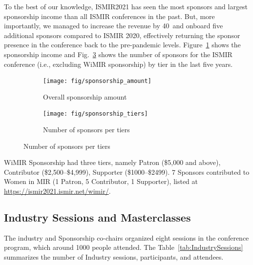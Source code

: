 \documentclass[%
10pt,								%
titlepage,						%
]
{scrartcl}
\begin{document}
        To the best of our knowledge, ISMIR2021 has seen the most sponsors and largest sponsorship income than all ISMIR conferences in the past. But, more importantly, we managed to increase the revenue by 40\ and onboard five additional sponsors compared to ISMIR 2020, effectively returning the sponsor presence in the conference back to the pre-pandemic levels. Figure~\ref{fig:sponsorship_amount} shows the sponsorship income and Fig.~\ref{fig:sponsorship_tiers} shows the number of sponsors for the ISMIR conference (i.e., excluding WiMIR sponsorship) by tier in the last five years.  
        \begin{figure}%
            \centering
            \begin{subfigure}{.45\textwidth}
                \texttt{[image: fig/sponsorship\_amount]}%
                \caption{Overall sponsorship amount}%
                \label{fig:sponsorship_amount}%
            \end{subfigure}
            \hfill
            \begin{subfigure}{.45\textwidth}
                \texttt{[image: fig/sponsorship\_tiers]}%
                \caption{Number of sponsors per tiers}%
                \label{fig:sponsorship_tiers}%
            \end{subfigure}
        \end{figure}
        
        WiMIR Sponsorship had three tiers, namely Patron (\$5,000 and above), Contributor (\$2,500--\$4,999), Supporter (\$1000--\$2499). 7 Sponsors contributed to Women in MIR (1 Patron, 5 Contributor, 1 Supporter), listed at \href{https://ismir2021.ismir.net/wimir/}{https://ismir2021.ismir.net/wimir/}. 
        
        
    \subsection{Industry Sessions and Masterclasses}
        The industry and Sponsorship co-chairs organized eight sessions in the conference program, which around 1000 people attended. The Table~\ref{tab:IndustrySessions} summarizes the number of Industry sessions, participants, and attendees. 
        
\end{document}

